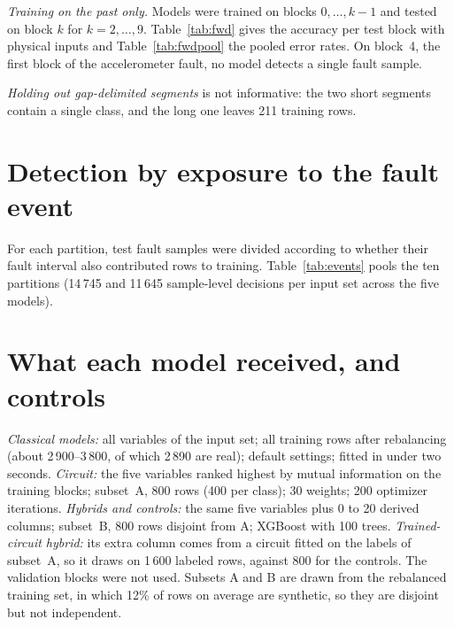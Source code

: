 \documentclass[10pt,a4paper]{article}
\newcommand{\T}[1]{}
\begin{document}
\begin{table}[h]\centering\small
\caption{Mean F1 of the classical models under different splits.}\label{tab:split}
\T{S3_split_design}
\end{table}

\emph{Training on the past only.} Models were trained on blocks $0,\dots,k-1$
and tested on block $k$ for $k=2,\dots,9$. Table~\ref{tab:fwd} gives the
accuracy per test block with physical inputs and Table~\ref{tab:fwdpool}
the pooled error rates. On block~4, the first block of the accelerometer
fault, no model detects a single fault sample.

\begin{table}[h]\centering\small
\caption{Past-only training: accuracy on each test block (physical inputs).}\label{tab:fwd}
\T{S3_forward}
\end{table}
\begin{table}[h]\centering\small
\caption{Past-only training: results pooled over test blocks 2--9.}\label{tab:fwdpool}
\T{S3_forward_pooled}
\end{table}

\emph{Holding out gap-delimited segments} is not informative: the two short
segments contain a single class, and the long one leaves 211 training rows.

\section{Detection by exposure to the fault event}
For each partition, test fault samples were divided according to whether
their fault interval also contributed rows to training. Table~\ref{tab:events}
pools the ten partitions (14\,745 and 11\,645 sample-level decisions per
input set across the five models).

\begin{table}[h]\centering\small
\caption{Fraction of fault samples detected.}\label{tab:events}
\T{S4_events}
\end{table}

\clearpage
\section{What each model received, and controls}
\emph{Classical models:} all variables of the input set; all training rows
after rebalancing (about 2\,900--3\,800, of which 2\,890 are real); default
settings; fitted in under two seconds. \emph{Circuit:} the five variables
ranked highest by mutual information on the training blocks; subset~A, 800
rows (400 per class); 30 weights; 200 optimizer iterations.
\emph{Hybrids and controls:} the same five variables plus 0 to 20 derived
columns; subset~B, 800 rows disjoint from A; XGBoost with 100 trees.
\emph{Trained-circuit hybrid:} its extra column comes from a circuit fitted
on the labels of subset~A, so it draws on 1\,600 labeled rows, against 800
for the controls. The validation blocks were not used. Subsets A and B are
drawn from the rebalanced training set, in which 12\% of rows on average
are synthetic, so they are disjoint but not independent.
\end{document}
